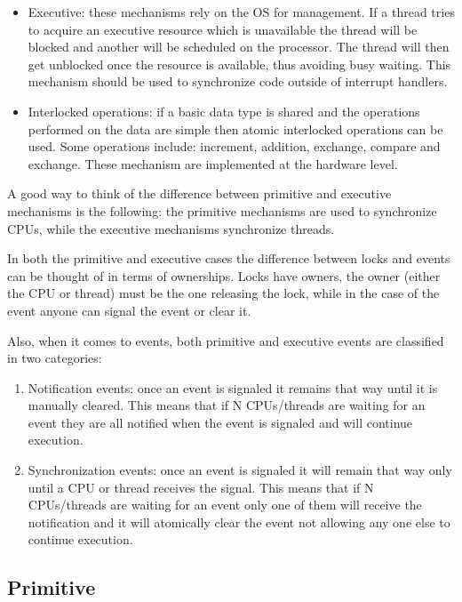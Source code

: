 \begin{appendices}
\begin{itemize}
	\item Executive: these mechanisms rely on the OS for management. If a thread tries to acquire
an executive resource which is unavailable the thread will be blocked and another will be scheduled
on the processor. The thread will then get unblocked once the resource is available, thus avoiding
busy waiting. This mechanism should be used to synchronize code outside of interrupt handlers.

	\item Interlocked operations: if a basic data type is shared and the operations performed on the
data are simple then atomic interlocked operations can be used. Some operations include: increment,
addition, exchange, compare and exchange. These mechanism are implemented at the hardware level.
\end{itemize}

A good way to think of the difference between primitive and executive mechanisms is the following:
the primitive mechanisms are used to synchronize CPUs, while the executive mechanisms synchronize
threads.

In both the primitive and executive cases the difference between locks and events can be thought of
in terms of ownerships. Locks have owners, the owner (either the CPU or thread) must be the one
releasing the lock, while in the case of the event anyone can signal the event or clear it.

Also, when it comes to events, both primitive and executive events are classified in two categories:
\begin{enumerate}
	\item Notification events: once an event is signaled it remains that way until it is manually
cleared. This means that if N CPUs/threads are waiting for an event they are all notified when the
event is signaled and will continue execution.

	\item Synchronization events: once an event is signaled it will remain that way only until a
CPU or thread receives the signal. This means that if N CPUs/threads are waiting for an event only
one of them will receive the notification and it will atomically clear the event not allowing any
one else to continue execution.
\end{enumerate}

\subsection{Primitive}
\label{sect:PrimSynch}


\end{appendices}
